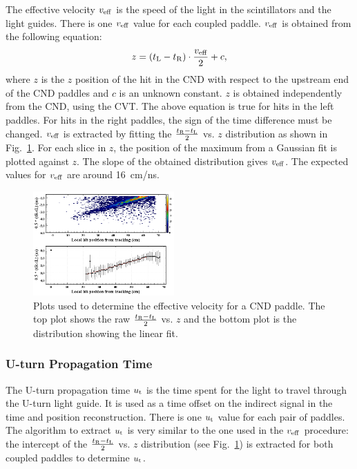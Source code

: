 The effective velocity $v_{\rm{eff}}$ is the speed of the light in the scintillators and the light guides. There is one $v_{\rm{eff}}$ value for each coupled paddle. $v_{\rm{eff}}$ is obtained from the following equation:
\begin{equation}
z=(t_{\rm{L}}-t_{\rm{R}})\cdot \frac{v_{\rm{eff}}}{2} + c,
\end{equation}
where $z$ is the $z$ position of the hit in the CND with respect to the upstream end of the CND paddles and $c$ is an unknown constant. $z$ is obtained independently from the CND, using the CVT. The above equation is true for hits in the left paddles. For hits in the right paddles, the sign of the time difference must be changed. $v_{\rm{eff}}$ is extracted by fitting the $\frac{t_{\rm{R}}-t_{\rm{L}}}{2}$ vs. $z$ distribution as shown in Fig.~\ref{effv}. For each slice in $z$, the position of the maximum from a Gaussian fit is plotted against $z$. The slope of the obtained distribution gives $v_{\rm{eff}}$. The expected values for $v_{\rm{eff}}$ are around 16~cm/ns.

\begin{figure}[htb]
\begin{center}
\includegraphics[width=0.48\textwidth]{Figure/veff.png} 
\end{center}
\caption{Plots used to determine the effective velocity for a CND paddle. The top plot shows the raw $\frac{t_{\rm{R}}-t_{\rm{L}}}{2}$ vs. $z$ and the bottom plot is the distribution showing the linear fit.}
\label{effv}
\end{figure}

\subsubsection{U-turn Propagation Time}

The U-turn propagation time $u_{\rm{t}}$ is the time spent for the light to travel through the U-turn light guide. It is used as a time offset on the indirect signal in the time and position reconstruction. There is one $u_{\rm{t}}$ value for each pair of paddles.
The algorithm to extract $u_{\rm{t}}$ is very similar to the one used in the $v_{\rm{eff}}$ procedure: the intercept of the $\frac{t_{\rm{R}}-t_{\rm{L}}}{2}$ vs. $z$ distribution (see Fig.~\ref{effv}) is extracted for both coupled paddles to determine $u_{\rm{t}}$.

